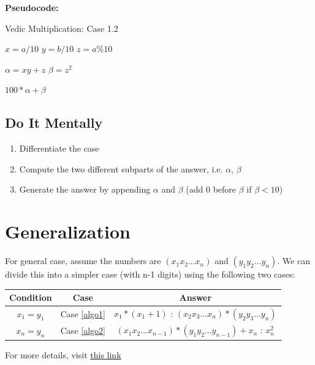 \documentclass{article}
\begin{document}
        \textbf{Pseudocode: }
        \begin{algorithm}
      	\caption{Vedic Multiplication: Case 1.2}
        \label{algo2}
        \begin{algorithmic}[1]
            
                \Statex $x = a/10$
                \Statex $y = b/10$
                \Statex $z = a\%10$
                
                \Statex $\alpha = xy+z$
                \Statex $\beta = z^{2}$
                
                \Return $100*\alpha + \beta$
                
            \EndProcedure
        \end{algorithmic}
    \end{algorithm}
    
    
    \newpage
    
    \subsection*{Do It Mentally}
        
        \begin{enumerate}
            \item Differentiate the case
            \item Compute the two different subparts of the answer, i.e. $\alpha$, $\beta$
            \item Generate the answer by appending $\alpha$ and $\beta$ (add $0$ before $\beta$ if $\beta < 10$)
        \end{enumerate}
    
\section*{Generalization}
    For general case, assume the numbers are $(x_{1}x_{2}...x_{n})$ and $(y_{1}y_{2}...y_{n})$. We can divide this into a simpler case (with n-1 digits) using the following two cases: \cite{maharaja}

    \begin{center}
        \begin{tabular}{ | c | c | c | }
            \hline
            Condition & Case & Answer\\
            \hline
            $x_{1} = y_{1}$ & Case \ref{algo1} & $x_{1}*(x_{1}+1)$ : $(x_{2}x_{3}...x_{n})*(y_{2}y_{3}...y_{n})$\\
                                 \hline
            $x_{n} = y_{n}$ & Case \ref{algo2} & $(x_{1}x_{2}...x_{n-1})*(y_{1}y_{2}...y_{n-1}) + x_{n}$ : $x_{n}^{2}$\\
            \hline
        \end{tabular}
    \end{center}



For more details, visit \href{https://en.wikibooks.org/wiki/Vedic_Mathematics/Techniques/Multiplication}{this link}
        
\end{document}
